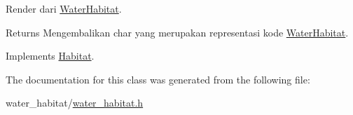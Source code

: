 Render dari \hyperlink{classWaterHabitat}{Water\+Habitat}. 

\begin{DoxyReturn}{Returns}
Mengembalikan char yang merupakan representasi kode \hyperlink{classWaterHabitat}{Water\+Habitat}. 
\end{DoxyReturn}


Implements \hyperlink{classHabitat_ad1bf10205d38e8e308eb9acc3aa2872c}{Habitat}.



The documentation for this class was generated from the following file\+:\begin{DoxyCompactItemize}
\item 
water\+\_\+habitat/\hyperlink{water__habitat_8h}{water\+\_\+habitat.\+h}\end{DoxyCompactItemize}
